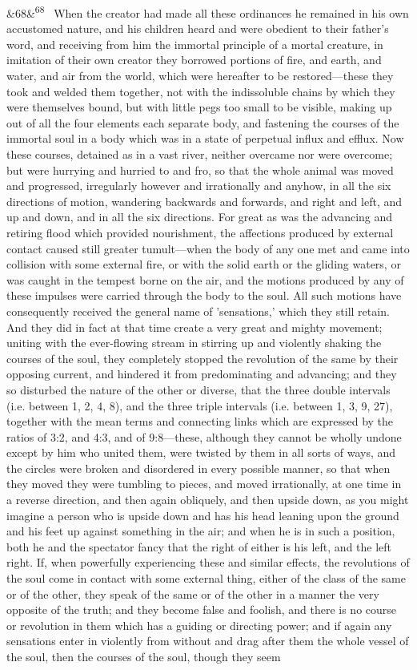 \documentclass[12pt]{article}
\newcommand{\para}[1][]{\par\noindent\ifx&#1&\else\textsuperscript{\footnotesize #1}~\fi}
\begin{document}
\para[68] When the creator had made all these ordinances he remained in his own accustomed nature, and his children heard and were obedient to their father's word, and receiving from him the immortal principle of a mortal creature, in imitation of their own creator they borrowed portions of fire, and earth, and water, and air from the world, which were hereafter to be restored---these they took and welded them together, not with the indissoluble chains by which they were themselves bound, but with little pegs too small to be visible, making up out of all the four elements each separate body, and fastening the courses of the immortal soul in a body which was in a state of perpetual influx and efflux. Now these courses, detained as in a vast river, neither overcame nor were overcome; but were hurrying and hurried to and fro, so that the whole animal was moved and progressed, irregularly however and irrationally and anyhow, in all the six directions of motion, wandering backwards and forwards, and right and left, and up and down, and in all the six directions. For great as was the advancing and retiring flood which provided nourishment, the affections produced by external contact caused still greater tumult---when the body of any one met and came into collision with some external fire, or with the solid earth or the gliding waters, or was caught in the tempest borne on the air, and the motions produced by any of these impulses were carried through the body to the soul. All such motions have consequently received the general name of 'sensations,' which they still retain. And they did in fact at that time create a very great and mighty movement; uniting with the ever-flowing stream in stirring up and violently shaking the courses of the soul, they completely stopped the revolution of the same by their opposing current, and hindered it from predominating and advancing; and they so disturbed the nature of the other or diverse, that the three double intervals (i.e. between 1, 2, 4, 8), and the three triple intervals (i.e. between 1, 3, 9, 27), together with the mean terms and connecting links which are expressed by the ratios of 3:2, and 4:3, and of 9:8---these, although they cannot be wholly undone except by him who united them, were twisted by them in all sorts of ways, and the circles were broken and disordered in every possible manner, so that when they moved they were tumbling to pieces, and moved irrationally, at one time in a reverse direction, and then again obliquely, and then upside down, as you might imagine a person who is upside down and has his head leaning upon the ground and his feet up against something in the air; and when he is in such a position, both he and the spectator fancy that the right of either is his left, and the left right. If, when powerfully experiencing these and similar effects, the revolutions of the soul come in contact with some external thing, either of the class of the same or of the other, they speak of the same or of the other in a manner the very opposite of the truth; and they become false and foolish, and there is no course or revolution in them which has a guiding or directing power; and if again any sensations enter in violently from without and drag after them the whole vessel of the soul, then the courses of the soul, though they seem 
\end{document}
